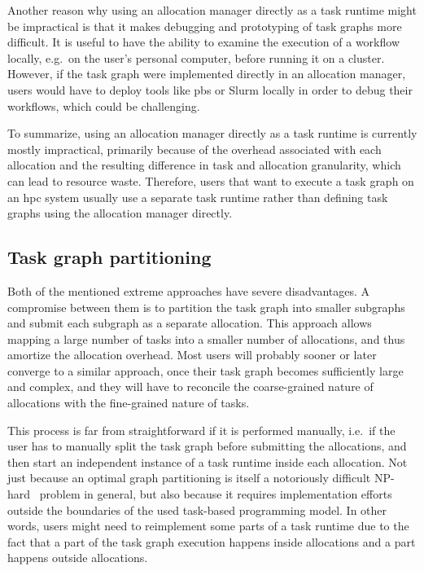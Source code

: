 Another reason why using an allocation manager directly as a task runtime might be impractical is
that it makes debugging and prototyping of task graphs more difficult. It is useful to have the
ability to examine the execution of a workflow locally, e.g.\ on the user's personal computer,
before running it on a cluster. However, if the task graph were implemented directly in an
allocation manager, users would have to deploy tools like \gls{pbs} or Slurm locally
in order to debug their workflows, which could be challenging.

To summarize, using an allocation manager directly as a task runtime is currently mostly
impractical, primarily because of the overhead associated with each allocation and the resulting
difference in task and allocation granularity, which can lead to resource waste. Therefore, users
that want to execute a task graph on an \gls{hpc} system usually use a separate task
runtime rather than defining task graphs using the allocation manager directly.

\subsection*{Task graph partitioning}
Both of the mentioned extreme approaches have severe disadvantages. A compromise between them is to
partition the task graph into smaller subgraphs and submit each subgraph as a separate allocation.
This approach allows mapping a large number of tasks into a smaller number of allocations, and thus
amortize the allocation overhead. Most users will probably sooner or later converge to a similar
approach, once their task graph becomes sufficiently large and complex, and they will have to
reconcile the coarse-grained nature of allocations with the fine-grained nature of tasks.

This process is far from straightforward if it is performed manually, i.e.\ if the user has to
manually split the task graph before submitting the allocations, and then start an independent
instance of a task runtime inside each allocation. Not just because an optimal graph partitioning
is itself a notoriously difficult NP-hard~\cite{graph_partitioning} problem in general, but also
because it requires implementation efforts outside the boundaries of the used task-based
programming model. In other words, users might need to reimplement some parts of a task runtime due
to the fact that a part of the task graph execution happens inside allocations and a part happens
outside allocations.

